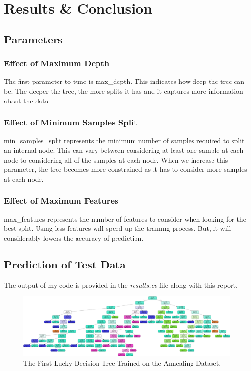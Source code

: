 \documentclass[12pt]{article}
\numberwithin{equation}{section}
\numberwithin{table}{section}
\numberwithin{figure}{section}
\begin{document}
\section{Results \& Conclusion}
\subsection{Parameters}
\subsubsection{Effect of Maximum Depth}
The first parameter to tune is max\_depth. This indicates how deep the tree can be. The deeper the tree, the more splits it has and it captures more information about the data.
\subsubsection{Effect of Minimum Samples Split}
min\_samples\_split represents the minimum number of samples required to split an internal node. This can vary between considering at least one sample at each node to considering all of the samples at each node. When we increase this parameter, the tree becomes more constrained as it has to consider more samples at each node.
\subsubsection{Effect of Maximum Features}
max\_features represents the number of features to consider when looking for the best split. Using less features will speed up the training process. But, it will considerably lowers the accuracy of prediction.
\subsection{Prediction of Test Data}
The output of my code is provided in the \textit{results.cv} file along with this report.
\begin{figure}
	\includegraphics[width=\textwidth]{dt1.png}
	\caption{The First Lucky Decision Tree Trained on the Annealing Dataset.}
	\label{fig:PropProf}
\end{figure}
\end{document}
